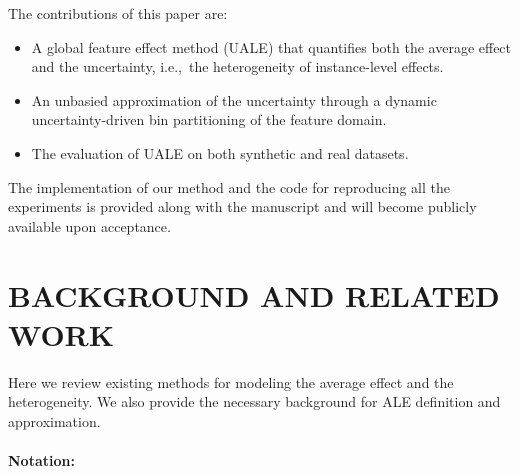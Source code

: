 \documentclass[twoside]{article}
\begin{document}
The contributions of this
paper are:
\begin{itemize}
\item A global feature effect method (UALE) that quantifies both the
  average effect and the uncertainty, i.e.,~the heterogeneity of
  instance-level effects.
\item An unbasied approximation of the uncertainty through a dynamic
  uncertainty-driven bin partitioning of the feature domain.
\item The evaluation of UALE on both synthetic and real datasets.
\end{itemize}

The implementation of our method and the code for reproducing all the
experiments is provided along with the manuscript and will become
publicly available upon acceptance.

\section{BACKGROUND AND RELATED WORK}

Here we review existing methods for modeling the average effect and
the heterogeneity. We also provide the necessary background for ALE
definition and approximation.

\paragraph{Notation:} 
\end{document}
